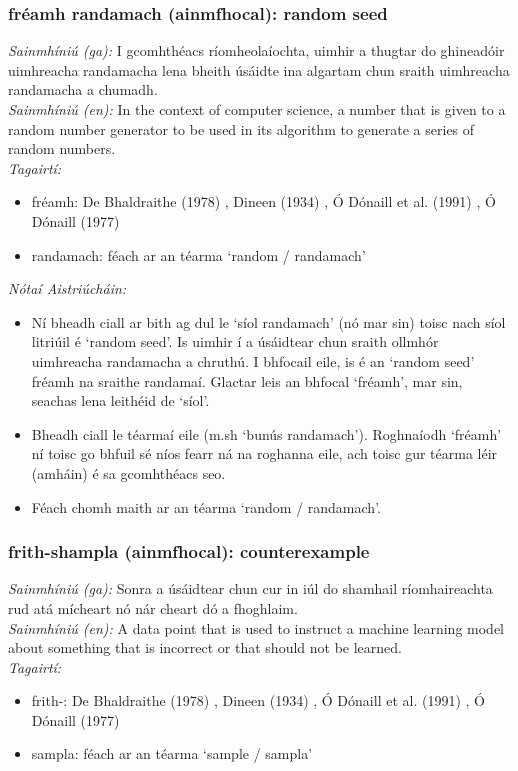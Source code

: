 \documentclass{article}
\begin{document}
\subsubsection*{fréamh randamach (ainmfhocal): random seed}
 \noindent \textit{Sainmhíniú (ga):} I gcomhthéacs ríomheolaíochta, uimhir a thugtar do ghineadóir uimhreacha randamacha lena bheith úsáidte ina algartam chun sraith uimhreacha randamacha a chumadh.
\\
 \noindent \textit{Sainmhíniú (en):} In the context of computer science, a number that is given to a random number generator to be used in its algorithm to generate a series of random numbers.
\\
 \noindent \textit{Tagairtí:}
\begin{itemize}
	\item fréamh: De Bhaldraithe (1978) \cite{de-bhaldraithe}, Dineen (1934) \cite{dineen}, Ó Dónaill et al. (1991) \cite{focloir-beag}, Ó Dónaill (1977) \cite{odonaill}
	\item randamach: féach ar an téarma `random / randamach'
\end{itemize}

 \noindent \textit{Nótaí Aistriúcháin:}
\begin{itemize}
	\item Ní bheadh ciall ar bith ag dul le `síol randamach' (nó mar sin) toisc nach síol litriúil é `random seed'. Is uimhir í a úsáidtear chun sraith ollmhór uimhreacha randamacha a chruthú. I bhfocail eile, is é an `random seed' fréamh na sraithe randamaí. Glactar leis an bhfocal `fréamh', mar sin, seachas lena leithéid de `síol'.
	\item Bheadh ciall le téarmaí eile (m.sh `bunús randamach'). Roghnaíodh `fréamh' ní toisc go bhfuil sé níos fearr ná na roghanna eile, ach toisc gur téarma léir (amháin) é sa gcomhthéacs seo.
	\item Féach chomh maith ar an téarma `random / randamach'.
\end{itemize}


\subsubsection*{frith-shampla (ainmfhocal): counterexample}
 \noindent \textit{Sainmhíniú (ga):} Sonra a úsáidtear chun cur in iúl do shamhail ríomhaireachta rud atá mícheart nó nár cheart dó a fhoghlaim.
\\
 \noindent \textit{Sainmhíniú (en):} A data point that is used to instruct a machine learning model about something that is incorrect or that should not be learned.
\\
 \noindent \textit{Tagairtí:}
\begin{itemize}
	\item frith-: De Bhaldraithe (1978) \cite{de-bhaldraithe}, Dineen (1934) \cite{dineen}, Ó Dónaill et al. (1991) \cite{focloir-beag}, Ó Dónaill (1977) \cite{odonaill}
	\item sampla: féach ar an téarma `sample / sampla'
\end{itemize}
\end{document}
